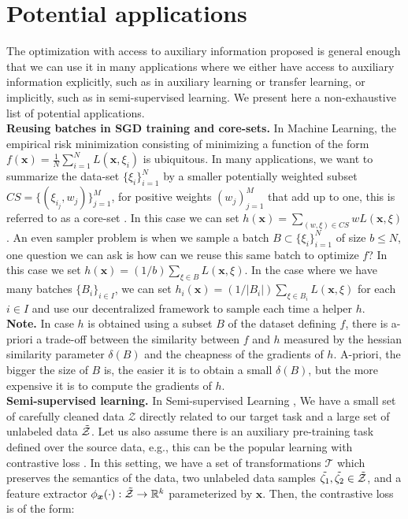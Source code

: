 \documentclass[10pt]{article} %
\newcommand{\comment}[1]{}
\theoremstyle{plain}
\theoremstyle{definition}
\theoremstyle{remark}
\def\vx{{\bm{x}}}
\newcommand{\R}{\mathbb{R}}
\begin{document}
\section{Potential applications}\label{applications}
The optimization with access to auxiliary information proposed is general enough that we can use it in many applications where we either have access to auxiliary information explicitly, such as in auxiliary learning or transfer learning, or implicitly, such as in semi-supervised learning. We present here a non-exhaustive list of potential applications.\\
\textbf{Reusing batches in SGD training and core-sets.} In Machine Learning, the empirical risk minimization consisting of minimizing a function of the form $f(\vx) = \frac{1}{N}\sum_{i=1}^N L(\vx,\xi_i)$ is ubiquitous. In many applications, we want to summarize the data-set $\{\xi_i\}_{i=1}^N$ by a smaller potentially weighted subset $CS  = \{(\xi_{i_j},w_j)\}_{j=1}^M$, for positive weights $(w_j)_{j=1}^M$ that add up to one, this is referred to as a core-set \citep{coreset}. In this case we can set $h(\vx) = \sum_{(w,\xi) \in CS} w L(\vx,\xi) $. An even sampler problem is when we sample a batch $B\subset \{\xi_i\}_{i=1}^N$ of size $b\leq N$, one question we can ask is how can we reuse this same batch to optimize $f$? In this case we set $h(\vx) = (1/b)\sum_{\xi \in B} L(\vx,\xi)$. In the case where we have many batches $\{B_i\}_{i\in I}$, we can set $h_i(\vx) = (1/\vert B_i\vert)\sum_{\xi \in B_i} L(\vx,\xi)$ for each $i\in I$ and use our decentralized framework to sample each time a helper $h$. \comment{In particular, the momentum variant proposed gives a generalization of the famous SVRG \citep{SVRG} to the case where instead of using the true gradient of $f$, we only have to sample an independent batch and use momentum.}\\
\textbf{Note.} In case $h$ is obtained using a subset $B$ of the dataset defining $f$, there is a-priori a trade-off between the similarity between $f$ and $h$ measured by the hessian similarity parameter $\delta(B)$ and the cheapness of the gradients of $h$. A-priori, the bigger the size of $B$ is, the easier it is to obtain a small $\delta(B)$, but the more expensive it is to compute the gradients of $h$.\\
\textbf{Semi-supervised learning.} In Semi-supervised Learning \citep{zhu2005semi}, We have a small set of carefully cleaned data $\mathcal{Z}$ directly related to our target task and a large set of unlabeled data $\Tilde{\mathcal{Z}}$. 
Let us also assume there is an auxiliary pre-training task defined over the source data, e.g., this can be the popular learning with contrastive loss \citep{chen2020simple}. In this setting, we have a set of transformations $\mathcal{T}$ which preserves the semantics of the data, two unlabeled data samples $\Tilde{\zeta_1}, \Tilde{\zeta_2} \in \Tilde{\mathcal{Z}}$, and a feature extractor $\phi_{\vx}(\cdot): \Tilde{\mathcal{Z}} \rightarrow \R^k$ parameterized by $\vx$. Then, the contrastive loss is of the form:
\end{document}

